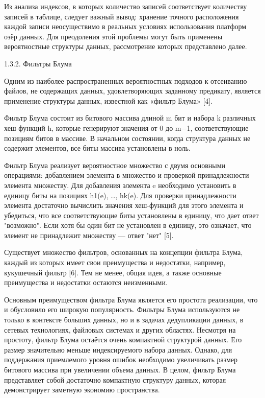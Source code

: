Из анализа индексов, в которых количество записей соответствует количеству записей в таблице, следует важный вывод: хранение точного 	расположения каждой записи неосуществимо в реальных условиях использования платформ озёр данных. Для преодоления этой проблемы могут быть применены вероятностные структуры данных, рассмотрение которых представлено далее.

1.3.2. Фильтры Блума

Одним из наиболее распространенных вероятностных подходов к отсеиванию файлов, не содержащих данных, удовлетворяющих заданному предикату, является применение структуры данных, известной как «фильтр Блума» [4].

Фильтр Блума состоит из битового массива длиной m бит и набора k различных хеш-функций h, которые генерируют значения от 0 до m−1, соответствующие позициям битов в массиве. В начальном состоянии, когда структура данных не содержит элементов, все биты массива установлены в ноль.

Фильтр Блума реализует вероятностное множество с двумя основными операциями: добавлением элемента в множество и проверкой принадлежности элемента множеству. Для добавления элемента e необходимо установить в единицу биты на позициях h1(e), …, hk(e). Для проверки принадлежности элемента достаточно вычислить значения хеш-функций для этого элемента и убедиться, что все соответствующие биты установлены в единицу, что дает ответ "возможно". Если хотя бы один бит не установлен в единицу, это означает, что элемент не принадлежит множеству — ответ "нет" [5].

Существует множество фильтров, основанных на концепции фильтра Блума, каждый из которых имеет свои преимущества и недостатки, например, кукушечный фильтр [6]. Тем не менее, общая идея, а также основные преимущества и недостатки остаются неизменными.

Основным преимуществом фильтра Блума является его простота реализации, что и обусловило его широкую популярность. Фильтры Блума используются не только в контексте больших данных, но и в задачах дедупликации данных, в сетевых технологиях, файловых системах и других областях. Несмотря на простоту, фильтр Блума остаётся очень компактной структурой данных. Его размер значительно меньше индексируемого набора данных. Однако, для поддержания приемлемого уровня ошибок необходимо увеличивать размер битового массива при увеличении объема данных. В целом, фильтр Блума представляет собой достаточно компактную структуру данных, которая демонстрирует заметную экономию пространства.

